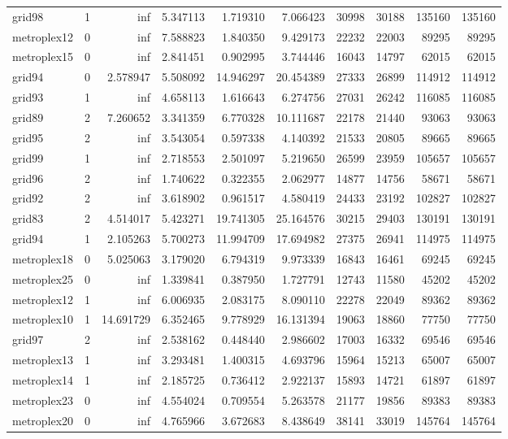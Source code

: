 \begin{longtable}{|l|r|r|r|r|r|r|r|r|r|}
grid98 & 1 & inf & 5.347113 & 1.719310 & 7.066423 & 30998 & 30188 & 135160 & 135160 \\
metroplex12 & 0 & inf & 7.588823 & 1.840350 & 9.429173 & 22232 & 22003 & 89295 & 89295 \\
metroplex15 & 0 & inf & 2.841451 & 0.902995 & 3.744446 & 16043 & 14797 & 62015 & 62015 \\
grid94 & 0 & 2.578947 & 5.508092 & 14.946297 & 20.454389 & 27333 & 26899 & 114912 & 114912 \\
grid93 & 1 & inf & 4.658113 & 1.616643 & 6.274756 & 27031 & 26242 & 116085 & 116085 \\
grid89 & 2 & 7.260652 & 3.341359 & 6.770328 & 10.111687 & 22178 & 21440 & 93063 & 93063 \\
grid95 & 2 & inf & 3.543054 & 0.597338 & 4.140392 & 21533 & 20805 & 89665 & 89665 \\
grid99 & 1 & inf & 2.718553 & 2.501097 & 5.219650 & 26599 & 23959 & 105657 & 105657 \\
grid96 & 2 & inf & 1.740622 & 0.322355 & 2.062977 & 14877 & 14756 & 58671 & 58671 \\
grid92 & 2 & inf & 3.618902 & 0.961517 & 4.580419 & 24433 & 23192 & 102827 & 102827 \\
grid83 & 2 & 4.514017 & 5.423271 & 19.741305 & 25.164576 & 30215 & 29403 & 130191 & 130191 \\
grid94 & 1 & 2.105263 & 5.700273 & 11.994709 & 17.694982 & 27375 & 26941 & 114975 & 114975 \\
metroplex18 & 0 & 5.025063 & 3.179020 & 6.794319 & 9.973339 & 16843 & 16461 & 69245 & 69245 \\
metroplex25 & 0 & inf & 1.339841 & 0.387950 & 1.727791 & 12743 & 11580 & 45202 & 45202 \\
metroplex12 & 1 & inf & 6.006935 & 2.083175 & 8.090110 & 22278 & 22049 & 89362 & 89362 \\
metroplex10 & 1 & 14.691729 & 6.352465 & 9.778929 & 16.131394 & 19063 & 18860 & 77750 & 77750 \\
grid97 & 2 & inf & 2.538162 & 0.448440 & 2.986602 & 17003 & 16332 & 69546 & 69546 \\
metroplex13 & 1 & inf & 3.293481 & 1.400315 & 4.693796 & 15964 & 15213 & 65007 & 65007 \\
metroplex14 & 1 & inf & 2.185725 & 0.736412 & 2.922137 & 15893 & 14721 & 61897 & 61897 \\
metroplex23 & 0 & inf & 4.554024 & 0.709554 & 5.263578 & 21177 & 19856 & 89383 & 89383 \\
metroplex20 & 0 & inf & 4.765966 & 3.672683 & 8.438649 & 38141 & 33019 & 145764 & 145764 \\

\end{longtable}
